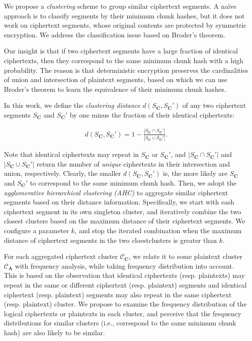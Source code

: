 We propose a {\em clustering} scheme to group similar ciphertext segments. A na\"{i}ve approach is to classify segments by their minimum chunk hashes, but it does not work on ciphertext segments, whose original contents are protected by symmetric encryption. We address the classification issue based on Broder's theorem.   
  
Our insight is that if two ciphertext segments have a large fraction of identical ciphertexts, then  they correspond to the same minimum chunk hash with a high probability. The reason is that deterministic encryption preserves the cardinalities of union and intersection of plaintext segments, based on which we can use Broder's theorem to learn the equivalence of their minimum chunk hashes.    

In this work, we define the {\em clustering distance} $d(S_\mathbf{C}, S_\mathbf{C}')$ of any two ciphertext segments $S_\mathbf{C}$ and $S_\mathbf{C}'$ by one minus the fraction of their identical ciphertexts:

\begin{eqnarray}
d(S_\mathbf{C}, S_\mathbf{C}') = 1 - \frac{|S_\mathbf{C} \cap S_\mathbf{C}'|}{|S_\mathbf{C} \cup S_\mathbf{C}'|}. \nonumber
\end{eqnarray}

Note that identical ciphertexts may repeat in $S_\mathbf{C}$ or $S_\mathbf{C}'$, and $|S_\mathbf{C} \cap S_\mathbf{C}'|$ and $|S_\mathbf{C} \cup S_\mathbf{C}'|$ return the number of {\em unique} ciphertexts in their  intersection and union, respectively. Clearly,  the smaller $d(S_\mathbf{C}, S_\mathbf{C}')$ is, the more likely are $S_\mathbf{C}$ and $S_\mathbf{C}'$ to correspond to the same minimum chunk hash. Then, we adopt the {\em agglomerative hierarchical clustering (AHC)} \cite{johnson67} to aggregate similar ciphertext segments based on their distance information.  Specifically, we start with eash ciphertext segment in its own singleton cluster, and iteratively combine the two closest clusters based on the maximum distance of their ciphertext segments. We configure a parameter $k$, and stop the iterated combination when the maximum distance of ciphertext segments in the two cloestclusters is greater than $k$.  

For each aggregated ciphertext cluster $\mathcal{C}_\mathbf{C}$, we relate it to some plaintext cluster $\mathcal{C}_\mathbf{A}$ with frequency analysis, while taking frequency distribution into account. This is based on the observation that identical ciphertexts (resp. plaintexts) may  repeat in the same or different ciphertext (resp. plaintext) segments and identical ciphertext (resp. plaintext) segments may also repeat in the same ciphertext (resp. plaintext) cluster. We propose to examine the frequency distribution of the logical ciphertexts or plaintexts in each cluster, and perceive that the frequency distributions for similar clusters (i.e., correspond to the same minimum chunk hash) are also likely to be similar. 
 
